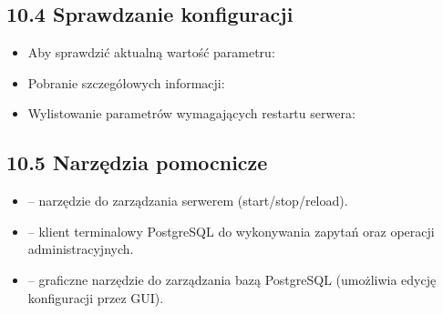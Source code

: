\documentclass[a4paper,11pt,polish]{sphinxmanual}
\begin{document}
\subsection{10.4 Sprawdzanie konfiguracji}
\label{\detokenize{Konfiguracja_baz_danych/Konfiguracja_baz_danych:sprawdzanie-konfiguracji}}\begin{itemize}
\item {} 
\sphinxAtStartPar
Aby sprawdzić aktualną wartość parametru:

\begin{sphinxVerbatim}[commandchars=\\\{\}]
 
\end{sphinxVerbatim}

\item {} 
\sphinxAtStartPar
Pobranie szczegółowych informacji:

\begin{sphinxVerbatim}[commandchars=\\\{\}]
     
 
   
\end{sphinxVerbatim}

\item {} 
\sphinxAtStartPar
Wylistowanie parametrów wymagających restartu serwera:

\begin{sphinxVerbatim}[commandchars=\\\{\}]
       
\end{sphinxVerbatim}

\end{itemize}


\subsection{10.5 Narzędzia pomocnicze}
\label{\detokenize{Konfiguracja_baz_danych/Konfiguracja_baz_danych:narzedzia-pomocnicze}}\begin{itemize}
\item {} 
\sphinxAtStartPar
{} – narzędzie do zarządzania serwerem (start/stop/reload).

\item {} 
\sphinxAtStartPar
{} – klient terminalowy PostgreSQL do wykonywania zapytań oraz operacji administracyjnych.

\item {} 
\sphinxAtStartPar
{} – graficzne narzędzie do zarządzania bazą PostgreSQL (umożliwia edycję konfiguracji przez GUI).

\end{itemize}
\end{document}
